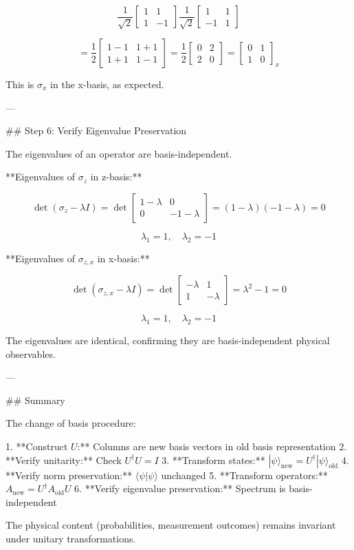 $$\frac{1}{\sqrt{2}}\begin{bmatrix} 1 & 1 \\ 1 & -1 \end{bmatrix} \frac{1}{\sqrt{2}}\begin{bmatrix} 1 & 1 \\ -1 & 1 \end{bmatrix}$$

$$= \frac{1}{2}\begin{bmatrix} 1-1 & 1+1 \\ 1+1 & 1-1 \end{bmatrix} = \frac{1}{2}\begin{bmatrix} 0 & 2 \\ 2 & 0 \end{bmatrix} = \begin{bmatrix} 0 & 1 \\ 1 & 0 \end{bmatrix}_x$$

This is $\sigma_x$ in the x-basis, as expected.

---

## Step 6: Verify Eigenvalue Preservation

The eigenvalues of an operator are basis-independent.

**Eigenvalues of $\sigma_z$ in z-basis:**

$$\det(\sigma_z - \lambda I) = \det\begin{bmatrix} 1-\lambda & 0 \\ 0 & -1-\lambda \end{bmatrix} = (1-\lambda)(-1-\lambda) = 0$$

$$\lambda_1 = 1, \quad \lambda_2 = -1$$

**Eigenvalues of $\sigma_{z,x}$ in x-basis:**

$$\det(\sigma_{z,x} - \lambda I) = \det\begin{bmatrix} -\lambda & 1 \\ 1 & -\lambda \end{bmatrix} = \lambda^2 - 1 = 0$$

$$\lambda_1 = 1, \quad \lambda_2 = -1$$

The eigenvalues are identical, confirming they are basis-independent physical observables.

---

## Summary

The change of basis procedure:

1. **Construct $U$:** Columns are new basis vectors in old basis representation
2. **Verify unitarity:** Check $U^\dagger U = I$
3. **Transform states:** $|\psi\rangle_{\text{new}} = U^\dagger |\psi\rangle_{\text{old}}$
4. **Verify norm preservation:** $\langle \psi | \psi \rangle$ unchanged
5. **Transform operators:** $A_{\text{new}} = U^\dagger A_{\text{old}} U$
6. **Verify eigenvalue preservation:** Spectrum is basis-independent

The physical content (probabilities, measurement outcomes) remains invariant under unitary transformations.